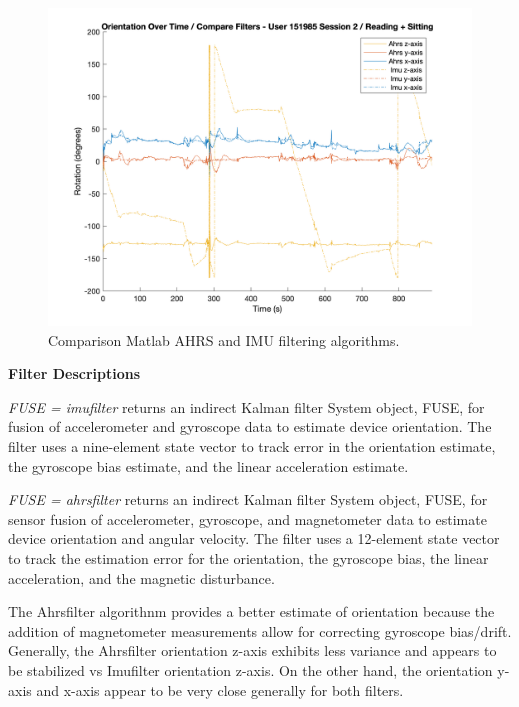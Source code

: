 \documentclass{article}
\begin{document}
\begin{figure}[ht]
  \includegraphics[width=1\linewidth]{images/151985_2_orientation_compare_filters.png}
  \caption[]{Comparison Matlab AHRS and IMU filtering algorithms.}
  \label{fig:151985_2_compare_filter}
\end{figure}

\textbf{Filter Descriptions}

\textit{FUSE = imufilter} returns an indirect Kalman filter System object, FUSE, for fusion of accelerometer and gyroscope data to estimate device orientation. The filter uses a nine-element state vector to track error in the orientation estimate, the gyroscope bias estimate, and the linear acceleration estimate.

\textit{FUSE = ahrsfilter} returns an indirect Kalman filter System object, FUSE, for sensor fusion of accelerometer, gyroscope, and magnetometer data to estimate device orientation and angular velocity. The filter uses a 12-element state vector to track the estimation error for the orientation, the gyroscope bias, the linear acceleration, and the magnetic disturbance.

The Ahrsfilter algorithnm provides a better estimate of orientation because the addition of magnetometer measurements allow for correcting gyroscope bias/drift. Generally, the Ahrsfilter orientation z-axis exhibits less variance and appears to be stabilized vs Imufilter orientation z-axis. On the other hand, the orientation y-axis and x-axis appear to be very close generally for both filters.
\end{document}
